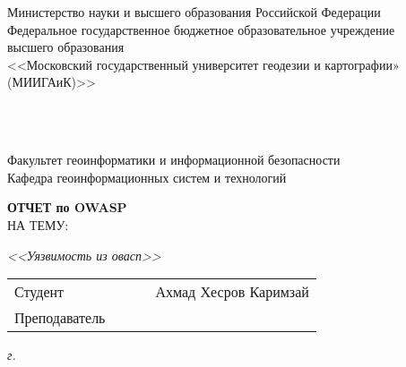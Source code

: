 \begin{titlepage}
	
	\centering
	
	\begin{wrapfigure}[7]{l}{0.14\linewidth}
		\vspace{3.4mm}
		\hspace{-8mm}
	\end{wrapfigure}
	
	{
		\singlespacing \small {}\selectfont
		Министерство науки и высшего образования Российской Федерации \\
		Федеральное государственное бюджетное образовательное учреждение \\
		высшего образования \\
		<<Московский государственный университет геодезии и картографии» \\
		(МИИГАиК)>> \\ 
	}
	
	\vspace{-4.2mm}
	\vhrulefill{0.2mm} \\
	\vspace{-6mm}
	\vhrulefill{0.9mm} \\
	\vspace{2.8mm}
	
	{
		\small \raggedright
		Факультет геоинформатики и информационной безопасности \\
		\vspace{3.3mm}
		Кафедра геоинформационных систем и технологий \\
	}
	
	\vspace{20.8mm}
	
	{
		\LARGE \bfseries
		ОТЧЕТ по OWASP \\
	}
	\vspace{5mm}
	{
		НА ТЕМУ: \\
	}
	
	{
		\Large \itshape
		<<Уязвимость из овасп>>
	}
	
	\vfill
	
	\begin{tabular}{p{}PPT}
		Студент &   & \uline{} & Ахмад Хесров Каримзай \\
		Преподаватель & ~ &  \uline{} & ~~~~~~~~~~~~~~~~~   \\
		
	\end{tabular}
	
	\vspace{14mm}
	
	\textit{{\the\year} г.}
	
\end{titlepage}